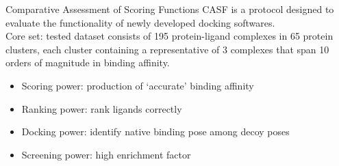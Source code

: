 \begin{frame}
\begin{columns}
    \begin{column}{0.55\textwidth}
\begin{block}{Comparative Assessment of Scoring Functions}
    CASF is a protocol designed to evaluate the functionality of newly developed docking softwares.\\
    Core set: tested dataset consists of 195 protein-ligand complexes in 65 protein clusters, each cluster containing a representative of 3 complexes that span 10 orders of magnitude in binding affinity.\\
    \begin{itemize}
      \item Scoring power: production of `accurate' binding affinity
      \item Ranking power: rank ligands correctly
      \item Docking power: identify native binding pose among decoy poses
      \item Screening power: high enrichment factor
    \end{itemize}
    \end{block}
    \end{column}
    \end{columns}
\end{frame}






